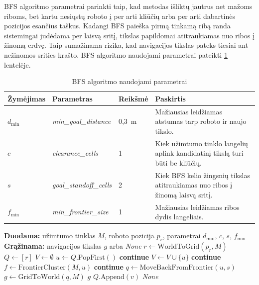 \documentclass[]{VUMIFTemplateClass}
\begin{document}
BFS algoritmo parametrai parinkti taip, kad metodas išliktų jautrus net mažoms riboms, bet kartu nesiųstų roboto į per arti kliūčių arba per arti dabartinės
pozicijos esančius taškus. Kadangi BFS paieška pirmą tinkamą ribą randa sistemingai judėdama per laisvą sritį, tikslas papildomai atitraukiamas nuo ribos į
žinomą erdvę. Taip sumažinama rizika, kad navigacijos tikslas pateks tiesiai ant nežinomos srities krašto. BFS algoritmo naudojami parametrai pateikti
\ref{tab:bfs-pseudocode-params} lentelėje.

\begin{table}[H]
\centering
\caption{BFS algoritmo naudojami parametrai}
\label{tab:bfs-pseudocode-params}
\small
\begin{tabular}{|p{1.8cm}|p{3.8cm}|p{2.1cm}|p{6.2cm}|}
\hline
\textbf{Žymėjimas} & \textbf{Parametras} & \textbf{Reikšmė} & \textbf{Paskirtis} \\
\hline
$d_{\min}$ & \textit{min\_goal\_distance} & 0,3~m & Mažiausias leidžiamas atstumas tarp roboto ir naujo tikslo. \\
\hline
$c$ & \textit{clearance\_cells} & 1 & Kiek užimtumo tinklo langelių aplink kandidatinį tikslą turi būti be kliūčių. \\
\hline
$s$ & \textit{goal\_standoff\_cells} & 2 & Kiek BFS kelio žingsnių tikslas atitraukiamas nuo ribos į žinomą laisvą sritį. \\
\hline
$f_{\min}$ & \textit{min\_frontier\_size} & 1 & Mažiausias leidžiamas ribos dydis langeliais. \\
\hline
\end{tabular}
\end{table}

\begin{algorithm}[H]
\caption{BFS}
\begin{algorithmic}[1]
\STATE \textbf{Duodama:} užimtumo tinklas $M$, roboto pozicija $p_r$, parametrai $d_{\min}$, $c$, $s$, $f_{\min}$
\STATE \textbf{Grąžinama:} navigacijos tikslas $g$ arba \textit{None}
\STATE $r \leftarrow \mathrm{WorldToGrid}(p_r, M)$
\STATE $Q \leftarrow [r]$
\STATE $V \leftarrow \emptyset$
  \STATE $u \leftarrow Q.\mathrm{PopFirst}()$
    \STATE \textbf{continue}
  \ENDIF
  \STATE $V \leftarrow V \cup \{u\}$
    \STATE \textbf{continue}
  \ENDIF
    \STATE $f \leftarrow \mathrm{FrontierCluster}(M,u)$
      \STATE \textbf{continue}
    \ENDIF
    \STATE $q \leftarrow \mathrm{MoveBackFromFrontier}(u,s)$
    \STATE $g \leftarrow \mathrm{GridToWorld}(q,M)$
      \RETURN $g$
    \ENDIF
  \ENDIF
      \STATE $Q.\mathrm{Append}(v)$
    \ENDIF
  \ENDFOR
\ENDWHILE
\RETURN \textit{None}
\end{algorithmic}
\end{algorithm}
\end{document}
